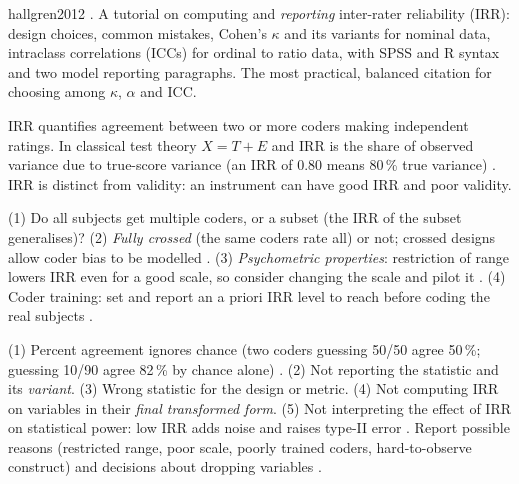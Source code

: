 \begin{papercard}{hallgren2012}
 . A tutorial on computing and \emph{reporting} inter-rater reliability (IRR): design choices, common mistakes, Cohen's $\kappa$ and its variants for nominal data, intraclass correlations (ICCs) for ordinal to ratio data, with SPSS and R syntax and two model reporting paragraphs. The most practical, balanced citation for choosing among $\kappa$, $\alpha$ and ICC.

 IRR quantifies agreement between two or more coders making independent ratings. In classical test theory $X=T+E$ and IRR is the share of observed variance due to true-score variance (an IRR of 0.80 means 80\,\% true variance) . IRR is distinct from validity: an instrument can have good IRR and poor validity.

 (1) Do all subjects get multiple coders, or a subset (the IRR of the subset generalises)? (2) \emph{Fully crossed} (the same coders rate all) or not; crossed designs allow coder bias to be modelled . (3) \emph{Psychometric properties}: restriction of range lowers IRR even for a good scale, so consider changing the scale and pilot it . (4) Coder training: set and report an a priori IRR level to reach before coding the real subjects .

 (1) Percent agreement ignores chance (two coders guessing 50/50 agree 50\,\%; guessing 10/90 agree 82\,\% by chance alone) . (2) Not reporting the statistic and its \emph{variant}. (3) Wrong statistic for the design or metric. (4) Not computing IRR on variables in their \emph{final transformed form}. (5) Not interpreting the effect of IRR on statistical power: low IRR adds noise and raises type-II error . Report possible reasons (restricted range, poor scale, poorly trained coders, hard-to-observe construct) and decisions about dropping variables .


\end{papercard}
